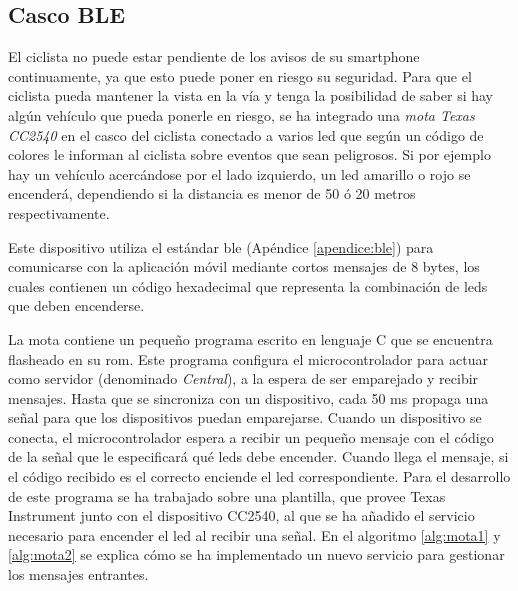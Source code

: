 \FloatBarrier
\subsection{Casco BLE}\label{ssection:cascoBLE}
El ciclista no puede estar pendiente de los avisos de su smartphone
continuamente, ya que esto puede poner en riesgo su seguridad. Para que el
ciclista pueda mantener la vista en la vía y tenga la posibilidad de saber si
hay algún vehículo que pueda ponerle en riesgo, se ha integrado una \emph{mota
Texas CC2540} en el casco del ciclista conectado a varios led que según un
código de colores le informan al ciclista sobre eventos que sean peligrosos.
Si por ejemplo hay un vehículo acercándose por el lado izquierdo, un led
amarillo o rojo se encenderá, dependiendo si la distancia es menor de 50 ó 20
metros respectivamente.

Este dispositivo utiliza el estándar \gls{ble} (Apéndice \ref{apendice:ble})
para comunicarse con la aplicación móvil mediante cortos mensajes de 8 bytes,
los cuales contienen un código hexadecimal que representa la combinación de
leds que deben encenderse.

La mota contiene un pequeño programa escrito en	lenguaje C que se encuentra
flasheado en su \gls{rom}. Este programa configura el microcontrolador para
actuar como servidor (denominado \emph{Central}), a la espera de ser
emparejado y recibir mensajes. Hasta que se sincroniza con un dispositivo,
cada 50 ms propaga una señal para que los dispositivos puedan emparejarse.
Cuando un dispositivo se conecta, el microcontrolador espera a recibir un
pequeño mensaje con el código de la señal que le especificará qué	leds debe
encender. Cuando llega el mensaje, si el código recibido es el correcto
enciende el led correspondiente. Para el desarrollo de este programa se ha
trabajado sobre una plantilla, que provee Texas Instrument junto con el
dispositivo CC2540,	al que se ha añadido el servicio necesario para encender
el led al recibir una señal. En el algoritmo \ref{alg:mota1} y \ref{alg:mota2}
se explica cómo se ha implementado un nuevo servicio para gestionar los
mensajes entrantes.


